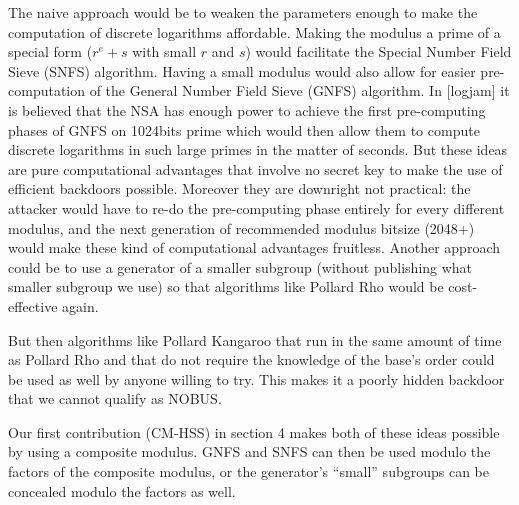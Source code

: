\documentclass[a4paper,11pt,twocolumn]{article}
\begin{document}
The naive approach would be to weaken the parameters enough to make the computation of discrete logarithms affordable. Making the modulus a prime of a special form ($r^e + s$ with small $r$ and $s$) would facilitate the Special Number Field Sieve (SNFS) algorithm. Having a small modulus would also allow for easier pre-computation of the General Number Field Sieve (GNFS) algorithm. In [logjam] it is believed that the NSA has enough power to achieve the first pre-computing phases of GNFS on 1024bits prime which would then allow them to compute discrete logarithms in such large primes in the matter of seconds. But these ideas are pure computational advantages that involve no secret key to make the use of efficient backdoors possible. Moreover they are downright not practical: the attacker would have to re-do the pre-computing phase entirely for every different modulus, and the next generation of recommended modulus bitsize (2048+) would make these kind of computational advantages fruitless. Another approach could be to use a generator of a smaller subgroup (without publishing what smaller subgroup we use) so that algorithms like Pollard Rho would be cost-effective again.

\begin{center}
\end{center}

But then algorithms like Pollard Kangaroo that run in the same amount of time as Pollard Rho and that do not require the knowledge of the base's order could be used as well by anyone willing to try. This makes it a poorly hidden backdoor that we cannot qualify as NOBUS.

Our first contribution (CM-HSS) in section 4 makes both of these ideas possible by using a composite modulus. GNFS and SNFS can then be used modulo the factors of the composite modulus, or the generator's ``small'' subgroups can be concealed modulo the factors as well.\\
\end{document}
